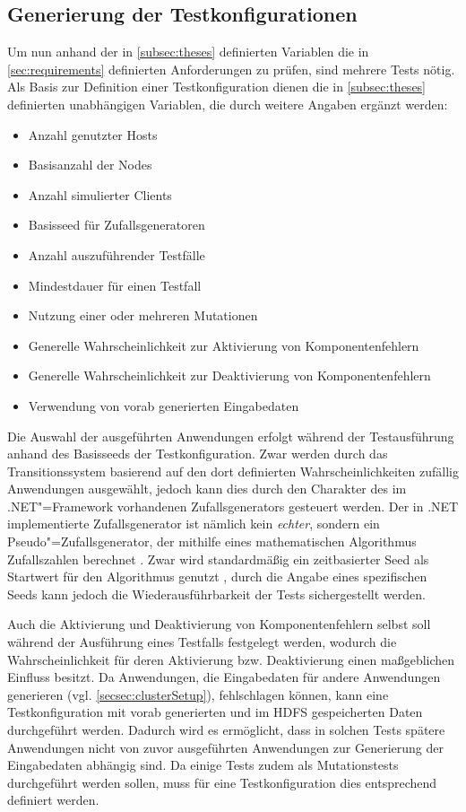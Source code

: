\subsection{Generierung der Testkonfigurationen}
\label{subsec:testcaseGeneration}

Um nun anhand der in \cref{subsec:theses} definierten Variablen die in \cref{sec:requirements} definierten Anforderungen zu prüfen, sind mehrere Tests nötig.
Als Basis zur Definition einer Testkonfiguration dienen die in \cref{subsec:theses} definierten unabhängigen Variablen, die durch weitere Angaben ergänzt werden:

\begin{itemize}
    \item Anzahl genutzter Hosts
    \item Basisanzahl der Nodes
    \item Anzahl simulierter Clients
    \item Basisseed für Zufallsgeneratoren
    \item Anzahl auszuführender Testfälle
    \item Mindestdauer für einen Testfall
    \item Nutzung einer oder mehreren Mutationen
    \item Generelle Wahrscheinlichkeit zur Aktivierung von Komponentenfehlern
    \item Generelle Wahrscheinlichkeit zur Deaktivierung von Komponentenfehlern
    \item Verwendung von vorab generierten Eingabedaten
\end{itemize}

Die Auswahl der ausgeführten Anwendungen erfolgt während der Testausführung anhand des Basisseeds der Testkonfiguration.
Zwar werden durch das Transitionssystem basierend auf den dort definierten Wahrscheinlichkeiten zufällig Anwendungen ausgewählt, jedoch kann dies durch den Charakter des im .NET"=Framework vorhandenen Zufallsgenerators gesteuert werden.
Der in .NET implementierte Zufallsgenerator ist nämlich kein \emph{echter}, sondern ein Pseudo"=Zufallsgenerator, der mithilfe eines mathematischen Algorithmus Zufallszahlen berechnet \cite{RandomClassDoc}.
Zwar wird standardmäßig ein zeitbasierter Seed als Startwert für den Algorithmus genutzt \cite{RandomClassDoc}, durch die Angabe eines spezifischen Seeds kann jedoch die Wiederausführbarkeit der Tests sichergestellt werden.

Auch die Aktivierung und Deaktivierung von Komponentenfehlern selbst soll während der Ausführung eines Testfalls festgelegt werden, wodurch die Wahrscheinlichkeit für deren Aktivierung bzw. Deaktivierung einen maßgeblichen Einfluss besitzt.
Da Anwendungen, die Eingabedaten für andere Anwendungen generieren (vgl. \cref{secsec:clusterSetup}), \uU fehlschlagen können, kann eine Testkonfiguration mit vorab generierten und im HDFS gespeicherten Daten durchgeführt werden.
Dadurch wird es ermöglicht, dass in solchen Tests spätere Anwendungen nicht von zuvor ausgeführten Anwendungen zur Generierung der Eingabedaten abhängig sind.
Da einige Tests zudem als Mutationstests durchgeführt werden sollen, muss für eine Testkonfiguration dies entsprechend definiert werden.

